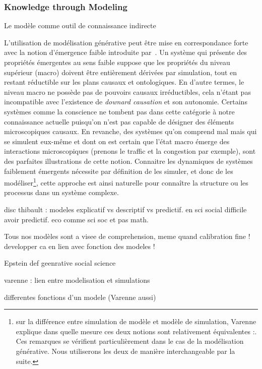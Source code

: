 \subsubsection{Knowledge through Modeling}{Le modèle comme outil de connaissance indirecte}




L'utilisation de modélisation générative peut être mise en correspondance forte avec la notion d'émergence faible introduite par~\cite{bedau2002downward}. Un système qui présente des propriétés émergentes au sens faible suppose que les propriétés du niveau supérieur (macro) doivent être entièrement dérivées par simulation, tout en restant réductible sur les plans causaux et ontologiques. En d'autre termes, le niveau macro ne possède pas de pouvoirs causaux irréductibles, cela n'étant pas incompatible avec l'existence de \emph{downard causation} et son autonomie. Certains systèmes comme la conscience ne tombent pas dans cette catégorie à notre connaissance actuelle puisqu'on n'est pas capable de désigner des éléments microscopiques causaux. En revanche, des systèmes qu'on comprend mal mais qui se simulent eux-même et dont on est certain que l'état macro émerge des interactions microscopiques (prenons le traffic et la congestion par exemple), sont des parfaites illustrations de cette notion. Connaitre les dynamiques de systèmes faiblement émergents nécessite par définition de les simuler, et donc de les modéliser\footnote{sur la différence entre simulation de modèle et modèle de simulation, Varenne explique dans quelle mesure ces deux notions sont relativement équivalentes :. Ces remarques se vérifient particulièrement dans le cas de la modélisation générative. Nous utiliserons les deux de manière interchangeable par la suite.}, cette approche est ainsi naturelle pour connaître la structure ou les processus dans un système complexe.


disc thibault : modeles explicatif vs descriptif vs predictif. en sci social difficile avoir predictif. eco comme sci soc et pas math.


Tous nos modèles sont a visee de comprehension, meme quand calibration fine ! developper ca en lien avec fonction des modeles !




Epstein def geenrative social science

varenne : lien entre modelisation et simulations \cite{phan2010agent}

differentes fonctions d'un modele (Varenne aussi)


